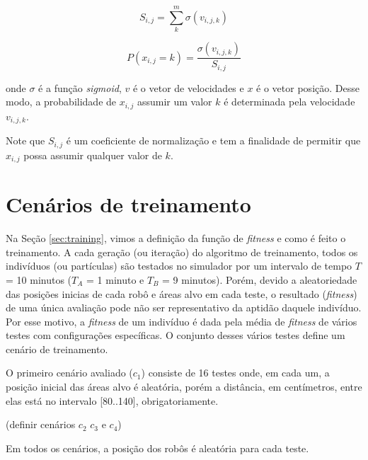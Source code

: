 $$
S_{i,j} = \sum_{k}^{m} \sigma(v_{i,j,k})
$$

$$
P(x_{i,j} = k) = \frac{\sigma (v_{i,j,k})}{S_{i,j}}
$$

onde $\sigma$ é a função \textit{sigmoid}, $v$ é o vetor de velocidades e $x$ é o vetor posição. Desse modo, a probabilidade de $x_{i,j}$ assumir um valor $k$ é determinada pela velocidade $v_{i,j,k}$.

Note que $S_{i,j}$ é um coeficiente de normalização e tem a finalidade de permitir que $x_{i,j}$ possa assumir qualquer valor de $k$.

\section{Cenários de treinamento}

Na Seção \ref{sec:training}, vimos a definição da função de \textit{fitness} e como é feito o treinamento. A cada geração (ou iteração) do algoritmo de treinamento, todos os indivíduos (ou partículas) são testados no simulador por um intervalo de tempo $T$ = 10 minutos ($T_{A}$ = 1 minuto e $T_{B}$ = 9 minutos). Porém, devido a aleatoriedade das posições inicias de cada robô e áreas alvo em cada teste, o resultado (\textit{fitness}) de uma única avaliação pode não ser representativo da aptidão daquele indivíduo. Por esse motivo, a \textit{fitness} de um indivíduo é dada pela média de \textit{fitness} de vários testes com configurações específicas. O conjunto desses vários testes define um cenário de treinamento.

O primeiro cenário avaliado ($c_{1}$) consiste de 16 testes onde, em cada um, a posição inicial das áreas alvo é aleatória, porém a distância, em centímetros, entre elas está no intervalo [80..140], obrigatoriamente.

(definir cenários $c_{2}$ $c_{3}$ e $c_{4}$)

Em todos os cenários, a posição dos robôs é aleatória para cada teste.